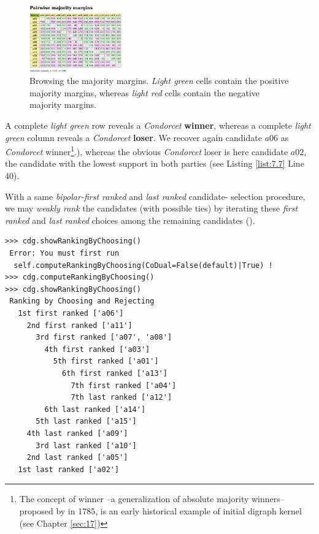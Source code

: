 \begin{figure}[h]
\sidecaption
\includegraphics[width=4cm]{Figures/majorityMargins.png}
\caption{Browsing the majority margins. \emph{Light green} cells contain the positive majority margins, whereas \emph{light red} cells contain the negative majority margins.}
\label{fig:7.4}       %
\end{figure}

A complete \emph{light green} row reveals a \emph{Condorcet} \textbf{winner}, whereas a complete \emph{light green} column reveals a \emph{Condorcet} \textbf{loser}. We recover again candidate $a06$ as \emph{Condorcet} winner\footnote{The concept of \Condorcet winner --a generalization of absolute majority winners-- proposed by \Condorcet in 1785, is an early historical example of initial digraph kernel (see Chapter \ref{sec:17})}.), whereas the obvious \emph{Condorcet} loser is here candidate $a02$, the candidate with the lowest support in both parties (see Listing \ref{list:7.7} Line 40).

With a same \emph{bipolar-first ranked} and \emph{last ranked} candidate- selection procedure, we may \emph{weakly rank} the candidates (with possible ties) by iterating these \emph{first ranked} and \emph{last ranked} choices among the remaining candidates (\citep{BIS-1999}).

\begin{lstlisting}[caption={Ranking by iterating choosing the \emph{first} and \emph{last} remaining candidates },label=list:7.10,basicstyle=\footnotesize]
>>> cdg.showRankingByChoosing()
 Error: You must first run
  self.computeRankingByChoosing(CoDual=False(default)|True) !
>>> cdg.computeRankingByChoosing()
>>> cdg.showRankingByChoosing()
 Ranking by Choosing and Rejecting
   1st first ranked ['a06']
     2nd first ranked ['a11']
       3rd first ranked ['a07', 'a08']
         4th first ranked ['a03']
           5th first ranked ['a01']
             6th first ranked ['a13']
               7th first ranked ['a04']
               7th last ranked ['a12']
	     6th last ranked ['a14']
	   5th last ranked ['a15']
	 4th last ranked ['a09']
       3rd last ranked ['a10']
     2nd last ranked ['a05']
   1st last ranked ['a02']
\end{lstlisting}
 
